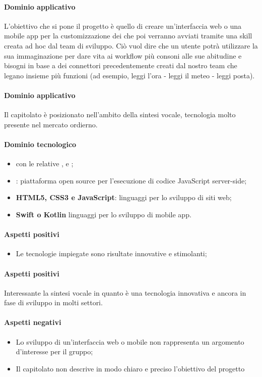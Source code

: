 	\paragraph{Dominio applicativo} \Spazio
     L’obiettivo che si pone il progetto è quello di creare un’interfaccia web o una mobile app per la customizzazione dei  che poi verranno avviati tramite una skill creata ad hoc dal team di sviluppo.
     Ciò vuol dire che un utente potrà utilizzare la sua immaginazione per dare vita ai workflow più consoni alle sue abitudine e bisogni in base a dei connettori precedentemente creati dal nostro team che legano insieme più funzioni (ad esempio, leggi l'ora - leggi il meteo - leggi posta).
	\paragraph{Dominio applicativo} 
     Il capitolato è posizionato nell'ambito della sintesi vocale, tecnologia molto presente nel mercato ordierno. 
	\paragraph{Dominio tecnologico}
	\begin{itemize}
		\item {\textbf{} con le relative ,  e };
		\item  \textbf{}: piattaforma open source per l'esecuzione di codice JavaScript server-side;
		\item \textbf{HTML5, CSS3 e JavaScript}: linguaggi per lo sviluppo di siti web;
		\item  \textbf{Swift o Kotlin} linguaggi per lo sviluppo di mobile app.
	\end{itemize}
	\paragraph{Aspetti positivi}
	\begin{itemize}
	\item {Le tecnologie impiegate sono risultate innovative e stimolanti;}
	\end{itemize}
	\paragraph{Aspetti positivi} 
	Interessante la sintesi vocale in quanto è una tecnologia innovativa e ancora in fase di sviluppo in molti settori.
	\paragraph{Aspetti negativi}
	\begin{itemize}
		\item Lo sviluppo di un'interfaccia web o mobile non rappresenta un argomento d'interesse per il gruppo;
		\item Il capitolato non descrive in modo chiaro e preciso l'obiettivo del progetto
	\end{itemize}
